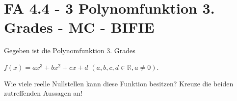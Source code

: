 \section{FA 4.4 - 3 Polynomfunktion 3. Grades - MC - BIFIE}

\begin{beispiel}[FA 4.4]{1} %
				Gegeben ist die Polynomfunktion 3. Grades \begin{center}
	$f(x)=ax^3+bx^2+cx+d$ $(a,b,c,d\in\mathbb{R},a\neq0)$.\end{center}
	
Wie viele reelle Nullstellen kann diese Funktion besitzen? Kreuze die beiden zutreffenden Aussagen an!

\end{beispiel}